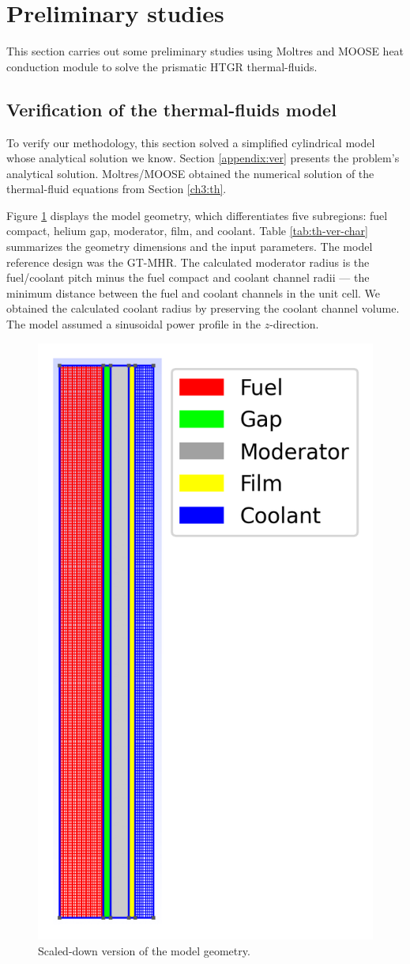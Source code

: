 \section{Preliminary studies}

This section carries out some preliminary studies using Moltres and MOOSE heat conduction module to solve the prismatic HTGR thermal-fluids.

\subsection{Verification of the thermal-fluids model}

To verify our methodology, this section solved a simplified cylindrical model whose analytical solution we know.
Section \ref{appendix:ver} presents the problem's analytical solution.
Moltres/MOOSE obtained the numerical solution of the thermal-fluid equations from Section \ref{ch3:th}.

Figure \ref{fig:th-ver-mesh} displays the model geometry, which differentiates five subregions: fuel compact, helium gap, moderator, film, and coolant.
Table \ref{tab:th-ver-char} summarizes the geometry dimensions and the input parameters.
The model reference design was the GT-MHR.
The calculated moderator radius is the fuel/coolant pitch minus the fuel compact and coolant channel radii --- the minimum distance between the fuel and coolant channels in the unit cell.
We obtained the calculated coolant radius by preserving the coolant channel volume.
The model assumed a sinusoidal power profile in the $z$-direction.

\begin{figure}[htbp!]
	\centering
	\includegraphics[width=0.25\linewidth]{figures-thermal/2D-preliminar-mesh2}
	\hfill
	\caption{Scaled-down version of the model geometry.}
	\label{fig:th-ver-mesh}
\end{figure}

